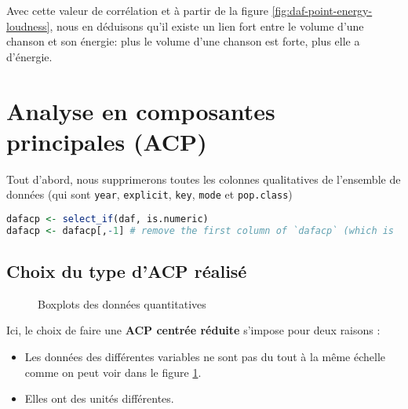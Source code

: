 \documentclass[
  11pt,
  xcolor = usenames,dvipsnames]{article}
\newcommand{\passthrough}[1]{#1}
\providecommand{\tightlist}{%
  \setlength{\itemsep}{0pt}\setlength{\parskip}{0pt}}
\begin{document}
Avec cette valeur de corrélation et à partir de la figure \ref{fig:daf-point-energy-loudness},
nous en déduisons qu'il existe un lien fort entre le volume d'une chanson et son énergie:
plus le volume d'une chanson est forte, plus elle a d'énergie.

\hypertarget{analyse-en-composantes-principales-acp}{%
\section{Analyse en composantes principales (ACP)}\label{analyse-en-composantes-principales-acp}}

Tout d'abord, nous supprimerons toutes les colonnes qualitatives de
l'ensemble de données (qui sont \passthrough{\lstinline!year!}, \passthrough{\lstinline!explicit!}, \passthrough{\lstinline!key!}, \passthrough{\lstinline!mode!} et \passthrough{\lstinline!pop.class!})

\begin{lstlisting}[language=R]
dafacp <- select_if(daf, is.numeric)
dafacp <- dafacp[,-1] # remove the first column of `dafacp` (which is `year`)
\end{lstlisting}

\hypertarget{choix-du-type-dacp-ruxe9alisuxe9}{%
\subsection{Choix du type d'ACP réalisé}\label{choix-du-type-dacp-ruxe9alisuxe9}}

\begin{figure}

{\centering {}

}

\caption{Boxplots des données quantitatives}\label{fig:boxplot-comparison}
\end{figure}

Ici, le choix de faire une \textbf{ACP centrée réduite} s'impose pour deux raisons :

\begin{itemize}
\tightlist
\item
  Les données des différentes variables ne sont pas du tout à la même échelle comme on peut voir dans le figure \ref{fig:boxplot-comparison}.
\item
  Elles ont des unités différentes.
\end{itemize}
\end{document}
